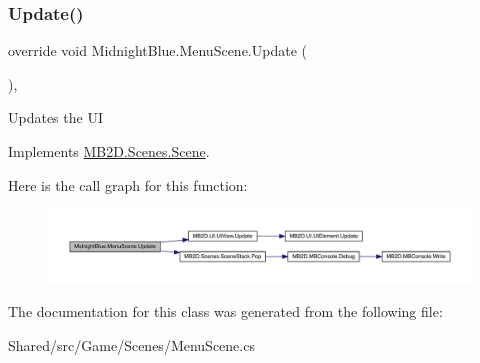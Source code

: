 \hypertarget{class_midnight_blue_1_1_menu_scene_af82ad49ba2744422e52fc6c1b8544255}{}\label{class_midnight_blue_1_1_menu_scene_af82ad49ba2744422e52fc6c1b8544255} 
\subsubsection{\texorpdfstring{Update()}{Update()}}
{\footnotesize\ttfamily override void Midnight\+Blue.\+Menu\+Scene.\+Update (\begin{DoxyParamCaption}{ }\end{DoxyParamCaption})\hspace{0.3cm}{\ttfamily [inline]}, {\ttfamily [virtual]}}



Updates the UI 



Implements \hyperlink{class_m_b2_d_1_1_scenes_1_1_scene_a779de7c1ab23b698dcde3a228324a991}{M\+B2\+D.\+Scenes.\+Scene}.

Here is the call graph for this function\+:\nopagebreak
\begin{figure}[H]
\begin{center}
\leavevmode
\includegraphics[width=350pt]{class_midnight_blue_1_1_menu_scene_af82ad49ba2744422e52fc6c1b8544255_cgraph}
\end{center}
\end{figure}


The documentation for this class was generated from the following file\+:\begin{DoxyCompactItemize}
\item 
Shared/src/\+Game/\+Scenes/Menu\+Scene.\+cs\end{DoxyCompactItemize}
